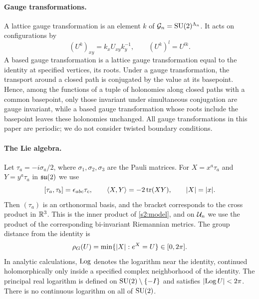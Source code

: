 \paragraph{Gauge transformations.}
A lattice gauge transformation is an element $k$ of $\mathcal G_{n}=\mathrm{SU}(2)^{\Lambda_{n}}$. It acts on configurations by
\begin{equation}\label{ch01:eq:lattice-gauge}
 (U^k)_{xy}=k_xU_{xy}k_y^{-1},\qquad (U^k)^l=U^{lk}.
\end{equation}
A based gauge transformation is a lattice gauge transformation equal to the identity at specified vertices, its roots. Under a gauge transformation, the transport around a closed path is conjugated by the value at its basepoint. Hence, among the functions of a tuple of holonomies along closed paths with a common basepoint, only those invariant under simultaneous conjugation are gauge invariant, while a based gauge transformation whose roots include the basepoint leaves these holonomies unchanged. All gauge transformations in this paper are periodic; we do not consider twisted boundary conditions.

\paragraph{The Lie algebra.}
Let $\tau_a=-i\sigma_a/2$, where $\sigma_1,\sigma_2,\sigma_3$ are the Pauli matrices. For $X=x^a\tau_a$ and $Y=y^a\tau_a$ in $\mathfrak{su}(2)$ we use
\[
 [\tau_a,\tau_b]=\epsilon_{abc}\tau_c,\qquad \langle X,Y\rangle=-2\operatorname{tr}(XY),\qquad \lvert X\rvert=\lvert x\rvert.
\]
Then $(\tau_a)$ is an orthonormal basis, and the bracket corresponds to the cross product in $\mathbb R^3$. This is the inner product of \cref{s2:model}, and on $\mathcal U_{n}$ we use the product of the corresponding bi-invariant Riemannian metrics. The group distance from the identity is
\[
 \rho_G(U)=\min\{\lvert X\rvert:e^X=U\}\in[0,2\pi].
\]
In analytic calculations, $\operatorname{Log}$ denotes the logarithm near the identity, continued holomorphically only inside a specified complex neighborhood of the identity. The principal real logarithm is defined on $\mathrm{SU}(2)\setminus\{-I\}$ and satisfies $\lvert \operatorname{Log} U\rvert<2\pi$. There is no continuous logarithm on all of $\mathrm{SU}(2)$.

